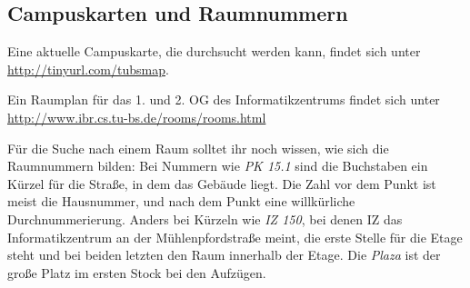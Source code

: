 \subsection{Campuskarten und Raumnummern}
\label{campuskarte}
Eine aktuelle Campuskarte, die durchsucht werden kann, findet sich unter \url{http://tinyurl.com/tubsmap}.

Ein Raumplan für das 1. und 2. OG des Informatikzentrums findet sich
unter \url{http://www.ibr.cs.tu-bs.de/rooms/rooms.html}


Für die Suche nach einem Raum solltet ihr noch wissen, wie sich die Raumnummern bilden: Bei Nummern wie \textit{PK 15.1} sind die Buchstaben ein Kürzel für die Straße, in dem das Gebäude liegt. Die Zahl vor dem Punkt ist meist die Hausnummer, und nach dem Punkt eine willkürliche Durchnummerierung. Anders bei Kürzeln wie \textit{IZ 150}, bei denen IZ das Informatikzentrum an der Mühlenpfordstraße meint, die erste Stelle für die Etage steht und bei beiden letzten den Raum innerhalb der Etage. Die \textit{Plaza} ist der große Platz im ersten Stock bei den Aufzügen.
